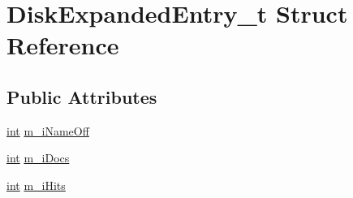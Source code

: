 \hypertarget{structDiskExpandedEntry__t}{\section{Disk\-Expanded\-Entry\-\_\-t Struct Reference}
\label{structDiskExpandedEntry__t}
}
\subsection*{Public Attributes}
\begin{DoxyCompactItemize}
\item 
\hyperlink{sphinxexpr_8cpp_a4a26e8f9cb8b736e0c4cbf4d16de985e}{int} \hyperlink{structDiskExpandedEntry__t_aa89a6ad092073a71a9d178424e5bfadd}{m\-\_\-i\-Name\-Off}
\item 
\hyperlink{sphinxexpr_8cpp_a4a26e8f9cb8b736e0c4cbf4d16de985e}{int} \hyperlink{structDiskExpandedEntry__t_a24b54a4db2b4344eed071cf8e6c0598c}{m\-\_\-i\-Docs}
\item 
\hyperlink{sphinxexpr_8cpp_a4a26e8f9cb8b736e0c4cbf4d16de985e}{int} \hyperlink{structDiskExpandedEntry__t_acfefa70d19307aa8ef63d3c2e38fd494}{m\-\_\-i\-Hits}
\end{DoxyCompactItemize}


